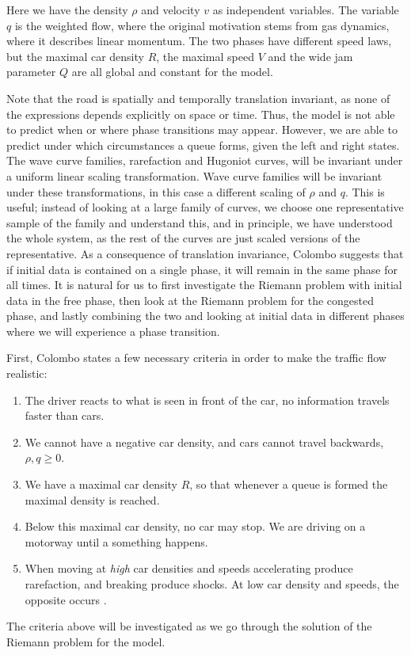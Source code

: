 \documentclass{article}
\numberwithin{equation}{section}
\begin{document}
Here we have the density $\rho$ and velocity $v$ as independent variables. The variable $q$ is the weighted flow, where the original motivation stems from gas dynamics, where it describes linear momentum. The two phases have different speed laws, but the maximal car density $R$, the maximal speed $V$ and the wide jam parameter $Q$ are all global and constant for the model. 

Note that the road is spatially and temporally translation invariant,  as none of the expressions depends explicitly on space or time. Thus, the model is not able to predict when or where phase transitions may appear. However, we are able to predict under which circumstances a queue forms, given the left and right states. The wave curve families, rarefaction and Hugoniot curves, will be invariant under a uniform linear scaling transformation. 
Wave curve families will be invariant under these transformations, in this case a different scaling of $\rho$ and $q$. This is useful; instead of looking at a  large family of curves, we choose one representative sample of the family and understand this, and in principle, we have understood the whole system, as the rest of the curves are just scaled versions of the representative. As a consequence of translation invariance, Colombo suggests that if initial data is contained on a single phase, it will remain in the same phase for all times. It is natural for us to first investigate the Riemann problem with initial data in the free phase, then look at the Riemann problem for the congested phase, and lastly combining the two and looking at initial data in different phases where we will experience a phase transition.

First, Colombo states a few necessary criteria in order to make the traffic flow realistic:
\begin{enumerate}
    \item The driver reacts to what is seen in front of the car, no information travels faster than cars.
    \item We cannot have a negative car density, and cars cannot travel backwards, $\rho, q \geq 0$.
    \item We have a maximal car density $R$, so that whenever a queue is formed the maximal density is reached. 
    \item Below this maximal car density, no car may stop. We are driving on a motorway until a something happens. 
    \item When moving at \textit{high} car densities and speeds accelerating produce rarefaction, and breaking produce shocks. At low car density and speeds, the opposite occurs \cite{Colombo2002}. 
\end{enumerate} The criteria above will be investigated as we go through the solution of the Riemann problem for the model. 
\end{document}
